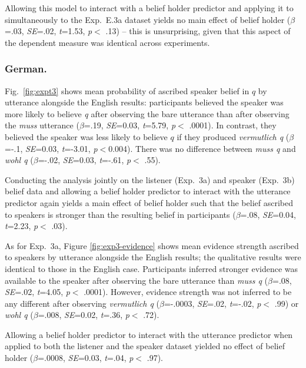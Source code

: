 \documentclass[11pt]{article}
\newcommand{\figref}[1]{Figure \ref{#1}}
\begin{document}
Allowing this model to interact with a belief holder predictor and applying it to simultaneously to the Exp.~E.3a dataset yields no main effect of belief holder ($\beta$=.03, \emph{SE}=.02, \emph{t}=1.53, \emph{p}$<$ .13) -- this is unsurprising, given that this aspect of the dependent measure was identical across experiments.

\subsubsection{German.} Fig.~\ref{fig:expt3} shows mean probability of ascribed speaker belief in $q$ by utterance alongside the English results: participants believed the speaker was more likely to believe \emph{q}  after observing the bare utterance than after observing the \emph{muss} utterance  ($\beta$=.19, \emph{SE}=0.03, \emph{t}=5.79, \emph{p}$<$ .0001). In contrast, they believed the speaker was less likely to believe $q$ if they produced \emph{vermutlich q} ($\beta$=-.1, \emph{SE}=0.03, \emph{t}=-3.01, \emph{p}$<$0.004). There was no difference between \emph{muss q} and \emph{wohl q} ($\beta$=-.02, \emph{SE}=0.03, \emph{t}=-.61, \emph{p}$<$ .55). 

Conducting the analysis jointly on the listener (Exp.~3a) and speaker  (Exp.~3b) belief data and allowing a belief holder predictor to interact with the utterance predictor again yields a main effect of belief holder such that the belief ascribed to speakers is stronger than the resulting belief in participants ($\beta$=.08, \emph{SE}=0.04, \emph{t}=2.23, \emph{p}$<$ .03).

As for Exp.~3a, \figref{fig:exp3-evidence} shows mean evidence strength ascribed to speakers by utterance alongside the English results; the qualitative results were identical to those in the English case. Participants inferred stronger evidence was available to the speaker after observing the bare utterance than \emph{muss q} ($\beta$=.08, \emph{SE}=.02, \emph{t}=4.05, \emph{p}$<$ .0001). However, evidence strength was not inferred to be any different after observing \emph{vermutlich q} ($\beta$=-.0003, \emph{SE}=.02, \emph{t}=-.02, \emph{p}$<$ .99) or \emph{wohl q} ($\beta$=.008, \emph{SE}=0.02, \emph{t}=.36, \emph{p}$<$ .72).

Allowing a belief holder predictor to interact with the utterance predictor when applied to both the listener and the speaker dataset yielded no effect of belief holder ($\beta$=.0008, \emph{SE}=0.03, \emph{t}=.04, \emph{p}$<$ .97).
\end{document}
